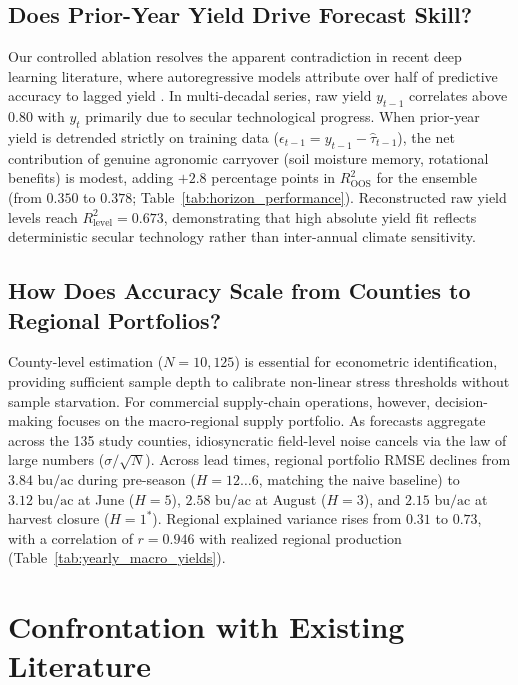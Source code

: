 \subsection{Does Prior-Year Yield Drive Forecast Skill?}
Our controlled ablation resolves the apparent contradiction in recent deep learning literature, where autoregressive models attribute over half of predictive accuracy to lagged yield \citep{ChenZhang2026}. In multi-decadal series, raw yield $y_{t-1}$ correlates above $0.80$ with $y_t$ primarily due to secular technological progress. When prior-year yield is detrended strictly on training data ($\epsilon_{t-1} = y_{t-1} - \hat{\tau}_{t-1}$), the net contribution of genuine agronomic carryover (soil moisture memory, rotational benefits) is modest, adding $+2.8$ percentage points in $R^2_{\text{OOS}}$ for the ensemble (from $0.350$ to $0.378$; Table~\ref{tab:horizon_performance}). Reconstructed raw yield levels reach $R^2_{\text{level}} = 0.673$, demonstrating that high absolute yield fit reflects deterministic secular technology rather than inter-annual climate sensitivity.

\subsection{How Does Accuracy Scale from Counties to Regional Portfolios?}
County-level estimation ($N = 10{,}125$) is essential for econometric identification, providing sufficient sample depth to calibrate non-linear stress thresholds without sample starvation. For commercial supply-chain operations, however, decision-making focuses on the macro-regional supply portfolio. As forecasts aggregate across the 135 study counties, idiosyncratic field-level noise cancels via the law of large numbers ($\sigma / \sqrt{N}$). Across lead times, regional portfolio RMSE declines from $3.84\text{ bu/ac}$ during pre-season ($H=12 \dots 6$, matching the naive baseline) to $3.12\text{ bu/ac}$ at June ($H=5$), $2.58\text{ bu/ac}$ at August ($H=3$), and $2.15\text{ bu/ac}$ at harvest closure ($H=1^*$). Regional explained variance rises from $0.31$ to $0.73$, with a correlation of $r = 0.946$ with realized regional production (Table~\ref{tab:yearly_macro_yields}).


\section{Confrontation with Existing Literature}
\label{sec:disc_literature}

